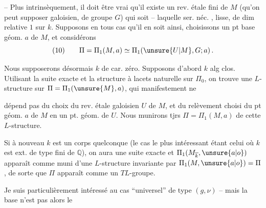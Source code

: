 
 -- Plus intrinsèquement, il doit être vrai qu'il existe un rev. étale fini de $M$ (qu'on peut supposer galoisien, de groupe $G$)  qui soit   -- laquelle ser. néc. , lisse, de dim relative $1$ sur $k$. Supposons en tous cas qu'il en soit ainsi, choisissons un pt base géom. $a$ de $M$, et considérons
\[
(10)\qquad \Pi=\Pi_1(M,a)\simeq\Pi_1(\unsure{U|M},G;a)\,.
\]

Nous supposerons désormais $k$ de car. zéro. Supposons d'abord $k$ alg clos. Utilisant la suite exacte
et la  structure à lacets naturelle sur $\Pi_0$, on trouve une $L$-structure sur $\Pi=\Pi_1(\unsure{M},a)$, qui manifestement ne


dépend pas du choix du rev. étale  galoisien $U$ de $M$, et du relèvement choisi du pt géom. $a$ de $M$ en un pt. géom. de $U$. Nous munirons tjrs  $\Pi=\Pi_1(M,a)$ de cette $L$-structure.

Si à nouveau $k$ est un corps quelconque (le cas le plus intéressant étant celui où $k$ est ext. de type fini de $\mathbb{Q}$), on aura une suite exacte
et $\Pi_1(M_{\overline{k}},\unsure{a|o})$ apparaît comme muni d'une $L$-structure invariante par $\Pi_1(M,\unsure{a|o})=\Pi$, de sorte que $\Pi$ apparaît comme un $TL$-groupe.

Je suis particulièrement intéressé au cas ``universel'' de type $(g,\nu)$ -- mais la base  n'est pas alors le


